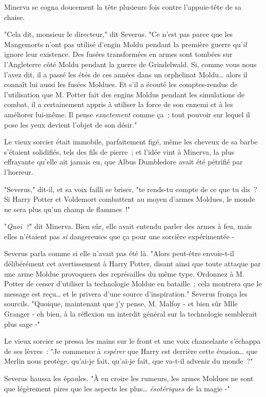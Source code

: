 Minerva se cogna doucement la tête plusieurs fois contre l'appuie-tête de sa chaise.

"Cela dit, monsieur le directeur," dit Severus. "Ce n'est pas parce que les Mangemorts n'ont pas utilisé d'engin Moldu pendant la première guerre qu'\emph{il} ignore leur existence. Des fusées transformées en armes sont tombées sur l'Angleterre côté Moldu pendant la guerre de Grindelwald. Si, comme vous nous l'avez dit, il a passé les étés de ces années dans un orphelinat Moldu… alors il connaît lui aussi les fusées Moldues. Et s'il a écouté les comptes-rendus de l'utilisation que M. Potter fait des engins Moldus pendant les simulations de combat, il a certainement appris à utiliser la force de son ennemi et à les améliorer lui-même. Il pense \emph{exactement} comme ça~; tout pouvoir sur lequel il pose les yeux devient l'objet de son désir."

Le vieux sorcier était immobile, parfaitement figé, même les cheveux de sa barbe s'étaient solidifiés, tels des fils de pierre~; et l'idée vint à Minerva, la plus effrayante qu'elle ait jamais eu, que Albus Dumbledore avait été pétrifié par l'horreur.

"Severus," dit-il, et sa voix failli se briser, "te rends-tu compte de ce que tu dis~? Si Harry Potter et Voldemort combattent au moyen d'armes Moldues, le monde ne sera plus qu'un champ de flammes~!"

"\emph{Quoi~?}" dit Minerva. Bien sûr, elle avait entendu parler des armes à feu, mais elles n'étaient pas \emph{si} dangereuses que ça pour une sorcière expérimentée -

Severus parla comme si elle n'avait pas été là. "Alors peut-être envoie-t-il délibérément cet avertissement à Harry Potter, disant ainsi que toute attaque par une arme Moldue provoquera des représailles du même type. Ordonnez à M. Potter de cesser d'utiliser la technologie Moldue en bataille~; cela montrera que le message est reçu… et le privera d'une source d'inspiration." Severus fronça les sourcils. "Quoique, maintenant que j'y pense, M. Malfoy - et bien sûr Mlle Granger - eh bien, à la réflexion un interdit général sur la technologie semblerait plus sage -"

Le vieux sorcier se pressa les mains sur le front et une voix chancelante s'échappa de ses lèvres~: "Je commence à \emph{espérer} que Harry est derrière cette évasion… que Merlin nous protège, qu'ai-je fait, qu'ai-je fait, que va-t-il advenir du monde~?"

Severus haussa les épaules. "À en croire les rumeurs, les armes Moldues ne sont que légèrement pires que les aspects les plus… \emph{ésotériques} de la magie -"

